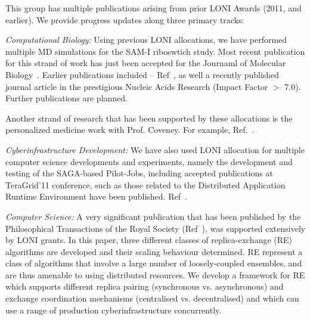 \documentclass[a4paper,10pt]{article}
\begin{document}

This group has multiple publications arising from prior LONI Awards
(2011, and earlier). We provide progress updates along three primary
tracks:

{\it Computational Biology:} Using previous LONI allocations, we have
performed multiple MD simulations for the SAM-I riboswtich study. Most
recent publication for this strand of work has just been accepted for
the Journaml of Molecular Biology~\cite{jmb2012}. Earlier publications
included -- Ref~\cite{ecmls10,ecmls10_ccpe10}, as well a recently
published journal article in the prestigious Nucleic Acids
Research\cite{SAM-I-NAR2009} (Impact Factor $>$ 7.0). Further
publications are planned.

Another strand of research that has been supported by these
allocations is the personalized medicine work with Prof. Coveney.  For
example, Ref.~\cite{tg-vph-interop}.

{\it Cyberinfrastructure Development:} We have also used LONI
allocation for multiple computer science developments and experiments,
namely the development and testing of the SAGA-based Pilot-Jobs,
including accepted publications at TeraGrid'11 conference, such as
those related to the Distributed Application Runtime Environment have
been published. Ref~\cite{dare-ecmls11, dare-tg11}.

{\it Computer Science:} A very significant publication that has been
published by the Philosophical Transactions of the Royal Society
(Ref~\cite{async_repex11}), was supported extensively by LONI grants.
In this paper, three different classes of replica-exchange (RE)
algorithms are developed and their scaling behaviour determined. RE
represent a class of algorithms that involve a large number of
loosely-coupled ensembles, and are thus amenable to using distributed
resources. We develop a framework for RE which supports different
replica pairing (synchronous vs.  asynchronous) and exchange
coordination mechanisms (centralised vs.  decentralised) and which can
use a range of production cyberinfrastructure concurrently.







%
%


\end{document}
